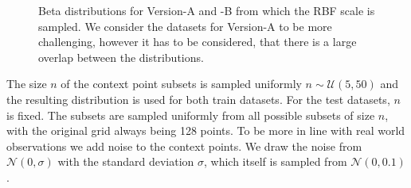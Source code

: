 \begin{figure}
	\centering
	\resizebox{0.4\textwidth}{!}{
		
	}
	\caption{Beta distributions for Version-A and -B from which the RBF scale is sampled. We consider the datasets for Version-A to be more challenging, however it has to be considered, that there is a large overlap between the distributions.}
	\label{fig:beta_scales}
\end{figure}

The size $n$ of the context point subsets is sampled uniformly $n\sim \mathcal{U}(5,50)$ and the resulting distribution is used for both train datasets.  For the test datasets, $n$ is fixed. The subsets are sampled uniformly from all possible subsets of size $n$, with the original grid always being 128 points. To be more in line with real world observations we add noise to the context points. We draw the noise from $\mathcal{N}(0,\sigma)$ with the standard deviation $\sigma$, which itself is sampled from $\mathcal{N}(0,0.1)$.